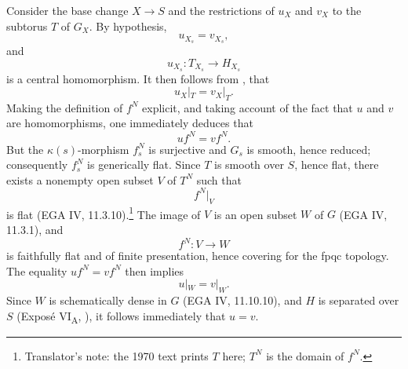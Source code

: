 Consider the base change \(X\to S\) and the restrictions of
\(u_X\) and \(v_X\) to the subtorus \(T\) of \(G_X\). By
hypothesis,
\[
  u_{X_s}=v_{X_s},
\]
and
\[
  u_{X_s}:T_{X_s}\longrightarrow H_{X_s}
\]
is a central homomorphism. It then follows from ,
that
\[
  u_X|_T=v_X|_T.
\]
Making the definition of \(f^N\) explicit, and taking account of
the fact that \(u\) and \(v\) are homomorphisms, one immediately
deduces that
\[
  uf^N=vf^N.
\]
But the \(\kappa(s)\)-morphism \(f_s^N\) is surjective and \(G_s\)
is smooth, hence reduced; consequently \(f_s^N\) is generically
flat. Since \(T\) is smooth over \(S\), hence flat, there exists a
nonempty open subset \(V\) of \(T^N\) such that
\[
  f^N|_V
\]
is flat (EGA IV, 11.3.10).\footnote{Translator's note: the 1970 text prints \(T\)
here; \(T^N\) is the domain of \(f^N\).} The image of \(V\) is an open subset
\(W\) of \(G\) (EGA IV, 11.3.1), and
\[
  f^N:V\longrightarrow W
\]
is faithfully flat and of finite presentation, hence covering for
the fpqc topology. The equality \(uf^N=vf^N\) then implies
\[
  u|_W=v|_W.
\]
Since \(W\) is schematically dense in \(G\) (EGA IV, 11.10.10),
and \(H\) is separated over \(S\) (Exposé VI\textsubscript{A},
), it follows immediately that \(u=v\).
